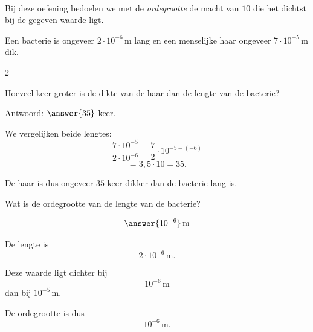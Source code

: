 \documentclass{ximera}
\begin{document}
            \begin{oefening}{\oefU}
                \\
                
                Bij deze oefening bedoelen we met de \emph{ordegrootte} de macht van $10$
                die het dichtst bij de gegeven waarde ligt.
                
                Een bacterie is ongeveer $2\cdot10^{-6}\,\mathrm m$ lang en een menselijke haar
                ongeveer $7\cdot10^{-5}\,\mathrm m$ dik.
                
                \begin{multicols}{2}
                
                \begin{question}
                Hoeveel keer groter is de dikte van de haar dan de lengte van de bacterie?
                
                Antwoord: $\answer{35}$ keer.
                
                \begin{oplossing}
                We vergelijken beide lengtes:
                \[
                \dfrac{7\cdot10^{-5}}{2\cdot10^{-6}}
                =\dfrac72\cdot10^{-5-(-6)}
                \]
                \[
                =3{,}5\cdot10
                =35.
                \]
                
                De haar is dus ongeveer $35$ keer dikker dan de bacterie lang is.
                \end{oplossing}
                \end{question}
                
                
                \begin{question}
                Wat is de ordegrootte van de lengte van de bacterie?
                
                \[
                \answer{10^{-6}}\,\mathrm m
                \]
                
                \begin{oplossing}
                De lengte is
                \[
                2\cdot10^{-6}\,\mathrm m.
                \]
                
                Deze waarde ligt dichter bij
                \[
                10^{-6}\,\mathrm m
                \]
                dan bij $10^{-5}\,\mathrm m$.
                
                De ordegrootte is dus
                \[
                10^{-6}\,\mathrm m.
                \]
                \end{oplossing}
                \end{question}
                

\end{multicols}
\end{oefening}
\end{document}
